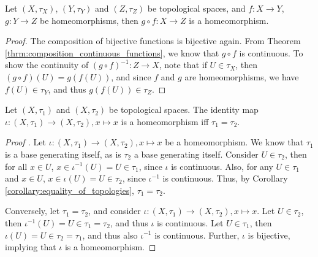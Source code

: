 \begin{theorem}\label{thrm:composition_homeomorphisms}
	Let $(X, \tau_X)$, $(Y, \tau_Y)$ and $(Z, \tau_Z)$ be topological spaces, and $f: X\to Y$, $g: Y\to Z$ be homeomorphisms, then $g\circ f: X\to Z$ is a homeomorphism.
\end{theorem}

\begin{proof}
	The composition of bijective functions is bijective again. From Theorem \ref{thrm:composition_continuous_functions}, we know that $g\circ f$ is continuous. To show the continuity of $(g\circ f)^{-1}: Z\to X$, note that if $U\in\tau_X$, then $(g\circ f)(U) = g(f(U))$, and since $f$ and $g$ are homeomorphisms, we have $f(U)\in \tau_Y$, and thus $g(f(U))\in\tau_Z$.
\end{proof}

\begin{theorem}\label{thrm:identity_homeomorphism_topologies_coincide}
	Let $(X, \tau_1)$ and $(X, \tau_2)$ be topological spaces. The identity map $\iota: (X, \tau_1)\to (X, \tau_2), x\mapsto x$ is a homeomorphism iff $\tau_1 = \tau_2$.
\end{theorem}

\begin{proof}[Proof \cite{3164142}]
	Let $\iota: (X, \tau_1)\to (X, \tau_2), x\mapsto x$ be a homeomorphism. We know that $\tau_1$ is a base generating itself, as is $\tau_2$ a base generating itself. Consider $U\in \tau_2$, then for all $x\in U$, $x\in \iota^{-1}(U) = U\in \tau_1$, since $\iota$ is continuous. Also, for any $U\in \tau_1$ and $x\in U$, $x\in \iota(U) = U\in \tau_2$, since $\iota^{-1}$ is continuous. Thus, by Corollary \ref{corollary:equality_of_topologies}, $\tau_1 = \tau_2$.
	
	Conversely, let $\tau_1 = \tau_2$, and consider $\iota: (X, \tau_1)\to (X, \tau_2), x\mapsto x$. Let $U\in \tau_2$, then $\iota^{-1}(U) = U\in \tau_1 = \tau_2$, and thus $\iota$ is continuous. Let $U\in\tau_1$, then $\iota(U) = U\in \tau_2 = \tau_1$, and thus also $\iota^{-1}$ is continuous. Further, $\iota$ is bijective, implying that $\iota$ is a homeomorphism.
\end{proof}